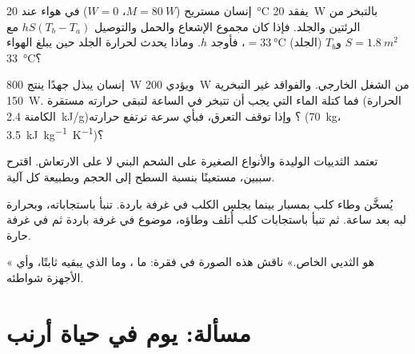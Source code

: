 \begin{exercise}[$\star\star$]\label{exo:b1:mammal-organization:8}
إنسان مستريح ($M = \qty{80}{W}$، $W = 0$) في هواء عند
\qty{20}{\celsius} يفقد \qty{20}{W} بالتبخر من الرئتين والجلد. فإذا
كان مجموع الإشعاع والحمل والتوصيل $hS(T_b - T_a)$ مع
$S = \qty{1.8}{m^2}$ و$T_b$ (الجلد) $=
\qty{33}{\celsius}$، فأوجد
$h$. وماذا يحدث لحرارة الجلد حين يبلغ الهواء \qty{33}{\celsius}؟
\end{exercise}

\begin{exercise}[$\star\star$]\label{exo:b1:mammal-organization:9}
إنسان يبذل جهدًا ينتج \qty{800}{W} ويؤدي \qty{200}{W} من الشغل
الخارجي. والفواقد غير التبخرية \qty{150}{W}. فما كتلة الماء التي يجب
أن تتبخر في الساعة لتبقى حرارته مستقرة (الحرارة الكامنة
\qty{2.4}{kJ/g})؟ وإذا توقف التعرق، فبأي سرعة ترتفع حرارته
(\qty{70}{kg}، \qty{3.5}{kJ.kg^{-1}.K^{-1}})؟
\end{exercise}

\begin{exercise}[$\star\star\star$]\label{exo:b1:mammal-organization:10}
تعتمد الثدييات الوليدة والأنواع الصغيرة على الشحم البني لا على
الارتعاش. اقترح سببين، مستعينًا بنسبة السطح إلى الحجم وبطبيعة كل
آلية.
\end{exercise}

\begin{exercise}[$\star\star\star$]\label{exo:b1:mammal-organization:11}
يُسخَّن وطاء كلب بمسبار بينما يجلس الكلب في غرفة باردة. تنبأ
باستجاباته، وبحرارة لبه بعد ساعة. ثم تنبأ باستجابات كلب أُتلف وطاؤه،
موضوع في غرفة باردة ثم في غرفة حارة.
\end{exercise}

\begin{exercise}[$\star\star\star$]\label{exo:b1:mammal-organization:12}
« هو  الثديي الخاص.» ناقش هذه الصورة في فقرة: ما
، وما الذي يبقيه ثابتًا، وأي الأجهزة شواطئه.
\end{exercise}

\section{مسألة: يوم في حياة أرنب}

